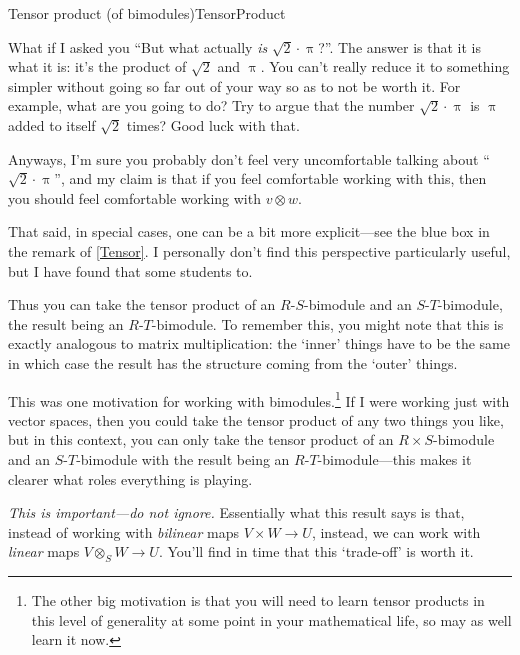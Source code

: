 \begin{thm}{Tensor product (of bimodules)}{TensorProduct}
\begin{rmk}
		What if I asked you ``But what actually \emph{is} $\sqrt{2}\cdot \uppi$?''.  The answer is that it is what it is:  it's the product of $\sqrt{2}$ and $\uppi$.  You can't really reduce it to something simpler without going so far out of your way so as to not be worth it.  For example, what are you going to do?  Try to argue that the number $\sqrt{2}\cdot \uppi$ is $\uppi$ added to itself $\sqrt{2}$ times?  Good luck with that.
		
		Anyways, I'm sure you probably don't feel very uncomfortable talking about ``$\sqrt{2}\cdot \uppi$'', and my claim is that if you feel comfortable working with this, then you should feel comfortable working with $v\otimes w$.
		
		That said, in special cases, one can be a bit more explicit---see the blue box in the remark of \cref{Tensor}.  I personally don't find this perspective particularly useful, but I have found that some students to.
	\end{rmk}
	\begin{rmk}
		Thus you can take the tensor product of an $R$-$S$-bimodule and an $S$-$T$-bimodule, the result being an $R$-$T$-bimodule.  To remember this, you might note that this is exactly analogous to matrix multiplication:  the `inner' things have to be the same in which case the result has the structure coming from the `outer' things.
		
		This was one motivation for working with bimodules.\footnote{The other big motivation is that you will need to learn tensor products in this level of generality at some point in your mathematical life, so may as well learn it now.}  If I were working just with vector spaces, then you could take the tensor product of any two things you like, but in this context, you can only take the tensor product of an $R\times S$-bimodule and an $S$-$T$-bimodule with the result being an $R$-$T$-bimodule---this makes it clearer what roles everything is playing. 
	\end{rmk}
	\begin{rmk}
		\emph{This is important---do not ignore.}  Essentially what this result says is that, instead of working with \emph{bilinear} maps $V\times W\rightarrow U$, instead, we can work with \emph{linear} maps $V\otimes _SW\rightarrow U$.  You'll find in time that this `trade-off' is worth it.
		

\end{rmk}
\end{thm}
